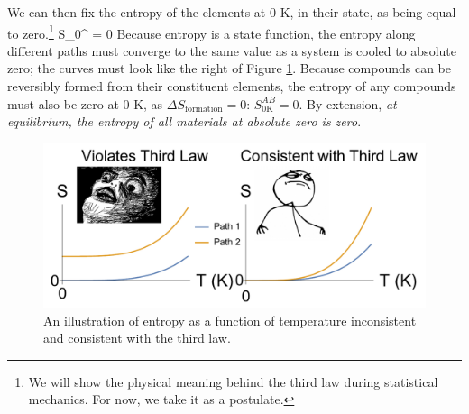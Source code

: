 \documentclass[12pt]{article}
\begin{document}
We can then fix the entropy of the elements at 0 K, in their  state, as being equal to zero.\footnote{We will show the physical meaning behind the third law during statistical mechanics. For now, we take it as a postulate.} \beq S_{0}^ = 0 \ceq
Because entropy is a state function, the entropy along different paths must converge to the same value as a system is cooled to absolute zero; the curves must look like the right of Figure \ref{ThirdLawConsistency}. Because compounds can be reversibly formed from their constituent elements, the entropy of any compounds must also be zero at 0 K, as $\Delta S_\text{formation}=0$: $S^{AB}_\text{0K} = 0$. By extension, \emph{at equilibrium, the entropy of all materials at absolute zero is zero}. 
\begin{figure}[h]
\centering
\includegraphics[width = 12cm]{thirdLawPlot_with_faces.pdf}
\caption{An illustration of entropy as a function of temperature inconsistent and consistent with the third law.}
\label{ThirdLawConsistency}
\end{figure}



\end{document}
